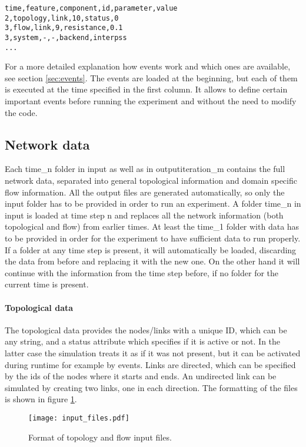 \documentclass[11pt,fleqn]{book} %
\begin{document}
\begin{lstlisting}[frame=single] 
time,feature,component,id,parameter,value
2,topology,link,10,status,0
3,flow,link,9,resistance,0.1
3,system,-,-,backend,interpss
...
\end{lstlisting}

For a more detailed explanation how events work and which ones are available, see  section \ref{sec:events}. The events are loaded at the beginning, but each of them is executed at the time specified in the first column. It allows to define certain important events before running the experiment and without the need to modify the code. 

\subsection{Network data}
Each time\_n folder in input as well as in output\/iteration\_m contains the full network data, separated into general topological information and domain specific flow information. All the output files are generated automatically, so only the input folder has to be provided in order to run an experiment. A folder time\_n in input is loaded at time step n and replaces all the network information (both topological and flow) from earlier times. At least the time\_1 folder with data has to be provided in order for the experiment to have sufficient data to run properly. If a folder at any time step is present, it will automatically be loaded, discarding the data from before and replacing it with the new one. On the other hand it will continue with the information from the time step before, if no folder for the current time is present.

\paragraph{Topological data} The topological data provides the nodes/links with a unique ID, which can be any string, and a status attribute which specifies if it is active or not. In the latter case the simulation treats it as if it was not present, but it can be activated during runtime for example by events. Links are directed, which can be specified by the ids of the nodes where it starts and ends. An undirected link can be simulated by creating two links, one in each direction. The formatting of the files is shown in figure \ref{fig:input_files}.

\begin{figure}[!h]
\centering\texttt{[image: input\_files.pdf]}
\caption{Format of topology and flow input files.}
\label{fig:input_files}
\end{figure}
\end{document}
